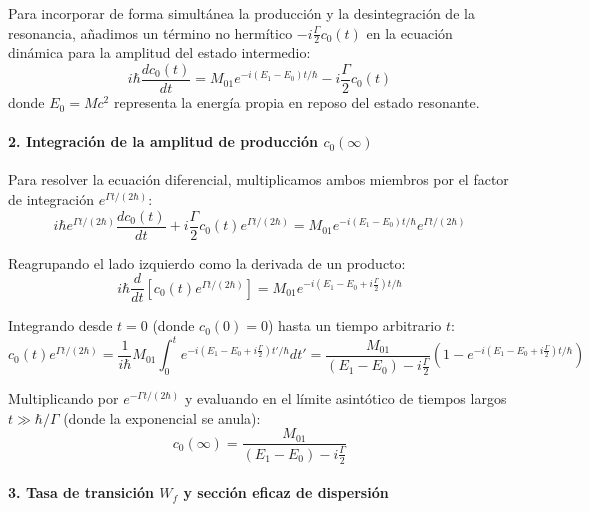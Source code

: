 Para incorporar de forma simultánea la producción y la desintegración de la resonancia, añadimos un término no hermítico $-i\frac{\Gamma}{2} c_0(t)$ en la ecuación dinámica para la amplitud del estado intermedio:
\begin{equation}
i\hbar \frac{dc_0(t)}{dt} = M_{01} e^{-i(E_1 - E_0)t/\hbar} - i\frac{\Gamma}{2} c_0(t)
\end{equation}
donde $E_0 = M c^2$ representa la energía propia en reposo del estado resonante.

\paragraph{2. Integración de la amplitud de producción $c_0(\infty)$}

Para resolver la ecuación diferencial, multiplicamos ambos miembros por el factor de integración $e^{\Gamma t / (2\hbar)}$:
\begin{equation}
i\hbar e^{\Gamma t / (2\hbar)} \frac{dc_0(t)}{dt} + i\frac{\Gamma}{2} c_0(t) e^{\Gamma t / (2\hbar)} = M_{01} e^{-i(E_1 - E_0)t/\hbar} e^{\Gamma t / (2\hbar)}
\end{equation}

Reagrupando el lado izquierdo como la derivada de un producto:
\begin{equation}
i\hbar \frac{d}{dt} \left[ c_0(t) e^{\Gamma t / (2\hbar)} \right] = M_{01} e^{-i\left( E_1 - E_0 + i\frac{\Gamma}{2} \right) t / \hbar}
\end{equation}

Integrando desde $t=0$ (donde $c_0(0) = 0$) hasta un tiempo arbitrario $t$:
\begin{equation}
c_0(t) e^{\Gamma t / (2\hbar)} = \frac{1}{i\hbar} M_{01} \int_0^t e^{-i\left( E_1 - E_0 + i\frac{\Gamma}{2} \right) t' / \hbar} dt' = \frac{M_{01}}{(E_1 - E_0) - i\frac{\Gamma}{2}} \left( 1 - e^{-i\left( E_1 - E_0 + i\frac{\Gamma}{2} \right) t / \hbar} \right)
\end{equation}

Multiplicando por $e^{-\Gamma t / (2\hbar)}$ y evaluando en el límite asintótico de tiempos largos $t \gg \hbar / \Gamma$ (donde la exponencial se anula):
\begin{equation}
c_0(\infty) = \frac{M_{01}}{(E_1 - E_0) - i\frac{\Gamma}{2}}
\end{equation}

\paragraph{3. Tasa de transición $W_f$ y sección eficaz de dispersión}

